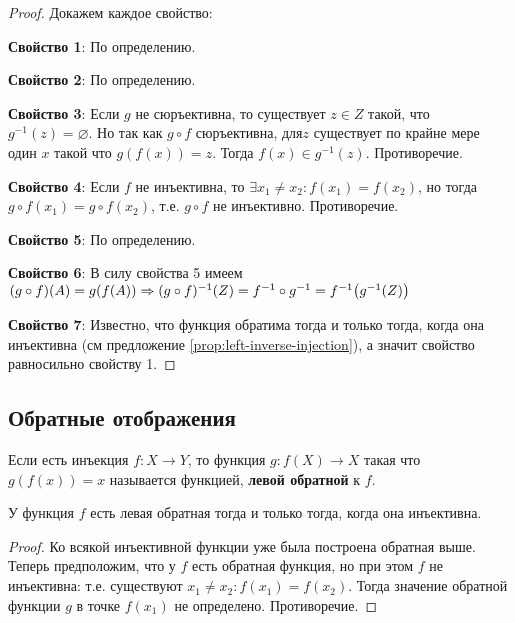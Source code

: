 \documentclass{article}
\begin{document}
\begin{proof} Докажем каждое свойство: 

    \textbf{Свойство 1}: По определению. 
    
    \textbf{Свойство 2}: По определению. 
    
    \textbf{Свойство 3}: Если \(g\) не сюръективна, то существует \(z \in Z\) такой, что \(g^{-1}(z) = \varnothing\). Но так как \(g \circ f\) сюръективна, для\(z\) существует по крайне мере один \(x\) такой что \(g(f(x)) = z\). Тогда \(f(x) \in g^{-1}(z)\). Противоречие.
    
    \textbf{Свойство 4}: Если \(f\) не инъективна, то \(\exists x_1 \ne x_2: f(x_1) = f(x_2)\), но тогда \(g \circ f (x_1) = g \circ f (x_2)\), т.е. \(g \circ f\) не инъективно. Противоречие. 
    
    \textbf{Свойство 5}: По определению. 
    
    \textbf{Свойство 6}: В силу свойства 5 имеем \((g \circ f)(A) = g(f(A)) \Rightarrow (g \circ f)^{-1}(Z) = f^{-1} \circ g^{-1} = f^{-1}\mleft(g^{-1}(Z)\mright)\)
    
    \textbf{Свойство 7}: Известно, что функция обратима тогда и только тогда, когда она инъективна (см предложение \ref{prop:left-inverse-injection}), а значит свойство равносильно свойству 1.
\end{proof}


\subsection{Обратные отображения}
\begin{definition}
    \label{def:left-inverse-function}
    Если есть инъекция \(f: X \rightarrow Y\), то функция \(g: f(X) \rightarrow X\) такая что \(g(f(x)) = x\) называется функцией, \textbf{левой обратной} к \(f\).
\end{definition}

\begin{proposition}
    \label{prop:left-inverse-injection}
    У функция \(f\) есть левая обратная тогда и только тогда, когда она инъективна. 
\end{proposition}
\begin{proof}
    Ко всякой инъективной функции уже была построена обратная выше.
    Теперь предположим, что у \(f\) есть обратная функция, но при этом \(f\) не инъективна: т.е. существуют \(x_1 \ne x_2: f(x_1) = f(x_2)\). Тогда значение обратной функции \(g\) в точке \(f(x_1)\) не определено. Противоречие. 
\end{proof}
\end{document}
